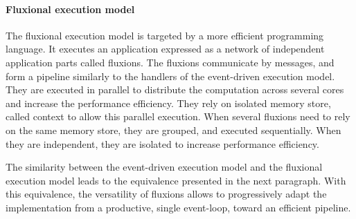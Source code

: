 \begin{figure}
  \centering{}
\end{figure}


\paragraph{Fluxional execution model}

The fluxional execution model is targeted by a more efficient programming language.
It executes an application expressed as a network of independent application parts called fluxions.
The fluxions communicate by messages, and form a pipeline similarly to the handlers of the event-driven execution model.
They are executed in parallel to distribute the computation across several cores and increase the performance efficiency.
They rely on isolated memory store, called context to allow this parallel execution.
When several fluxions need to rely on the same memory store, they are grouped, and executed sequentially.
When they are independent, they are isolated to increase performance efficiency.

The similarity between the event-driven execution model and the fluxional execution model leads to the equivalence presented in the next paragraph.
With this equivalence, the versatility of fluxions allows to progressively adapt the implementation from a productive, single event-loop, toward an efficient pipeline.

